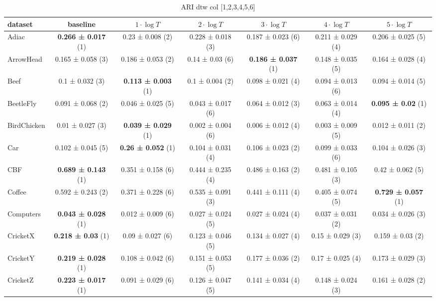 
\begin{table}[ht]
    \caption{ARI dtw col [1,2,3,4,5,6]} 
    \begin{adjustbox}{width=\textwidth}
    \begin{tabular}{lcccccc}
    \hline
    dataset & baseline & \textbf{$1\cdot \log{T}$} & \textbf{$2\cdot \log{T}$} & \textbf{$3\cdot \log{T}$} & \textbf{$4\cdot \log{T}$} & \textbf{$5\cdot \log{T}$} \\ \hline
    Adiac & \textbf{0.266 ± 0.017} (1) & 0.23 ± 0.008 (2) & 0.228 ± 0.018 (3) & 0.187 ± 0.023 (6) & 0.211 ± 0.029 (4) & 0.206 ± 0.025 (5) \\
    ArrowHead & 0.165 ± 0.058 (3) & 0.186 ± 0.053 (2) & 0.14 ± 0.03 (6) & \textbf{0.186 ± 0.037} (1) & 0.148 ± 0.035 (5) & 0.164 ± 0.028 (4) \\
    Beef & 0.1 ± 0.032 (3) & \textbf{0.113 ± 0.003} (1) & 0.1 ± 0.004 (2) & 0.098 ± 0.021 (4) & 0.094 ± 0.013 (6) & 0.094 ± 0.014 (5) \\
    BeetleFly & 0.091 ± 0.068 (2) & 0.046 ± 0.025 (5) & 0.043 ± 0.017 (6) & 0.064 ± 0.012 (3) & 0.063 ± 0.014 (4) & \textbf{0.095 ± 0.02} (1) \\
    BirdChicken & 0.01 ± 0.027 (3) & \textbf{0.039 ± 0.029} (1) & 0.002 ± 0.004 (6) & 0.006 ± 0.012 (4) & 0.003 ± 0.009 (5) & 0.012 ± 0.011 (2) \\
    Car & 0.102 ± 0.045 (5) & \textbf{0.26 ± 0.052} (1) & 0.104 ± 0.031 (4) & 0.106 ± 0.023 (2) & 0.099 ± 0.033 (6) & 0.104 ± 0.026 (3) \\
    CBF & \textbf{0.689 ± 0.143} (1) & 0.351 ± 0.158 (6) & 0.444 ± 0.235 (4) & 0.486 ± 0.163 (2) & 0.481 ± 0.105 (3) & 0.42 ± 0.062 (5) \\
    Coffee & 0.592 ± 0.243 (2) & 0.371 ± 0.228 (6) & 0.535 ± 0.091 (3) & 0.441 ± 0.111 (4) & 0.405 ± 0.074 (5) & \textbf{0.729 ± 0.057} (1) \\
    Computers & \textbf{0.043 ± 0.028} (1) & 0.012 ± 0.009 (6) & 0.027 ± 0.024 (5) & 0.027 ± 0.024 (4) & 0.037 ± 0.031 (2) & 0.034 ± 0.026 (3) \\
    CricketX & \textbf{0.218 ± 0.03} (1) & 0.09 ± 0.027 (6) & 0.123 ± 0.046 (5) & 0.134 ± 0.027 (4) & 0.15 ± 0.029 (3) & 0.159 ± 0.03 (2) \\
    CricketY & \textbf{0.219 ± 0.028} (1) & 0.108 ± 0.042 (6) & 0.151 ± 0.053 (5) & 0.177 ± 0.036 (2) & 0.17 ± 0.025 (4) & 0.173 ± 0.029 (3) \\
    CricketZ & \textbf{0.223 ± 0.017} (1) & 0.091 ± 0.029 (6) & 0.126 ± 0.047 (5) & 0.141 ± 0.034 (4) & 0.148 ± 0.024 (3) & 0.161 ± 0.028 (2) \\

\end{tabular}
\end{adjustbox}
\end{table}
